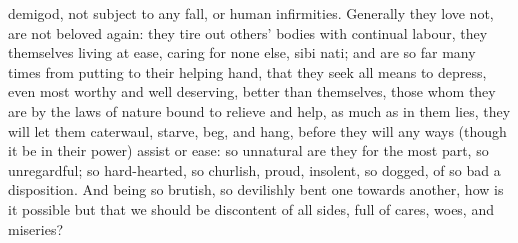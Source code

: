 {{demigod, not subject to any fall, or human infirmities. Generally they
love not, are not beloved again: they tire out others' bodies with
continual labour, they themselves living at ease, caring for none else,
sibi nati; and are so far many times from putting to their helping
hand, that they seek all means to depress, even most worthy and well
deserving, better than themselves, those whom they are by the laws of
nature bound to relieve and help, as much as in them lies, they will
let them caterwaul, starve, beg, and hang, before they will any ways
(though it be in their power) assist or ease: so unnatural are
they for the most part, so unregardful; so hard-hearted, so churlish,
proud, insolent, so dogged, of so bad a disposition. And being so
brutish, so devilishly bent one towards another, how is it possible but
that we should be discontent of all sides, full of cares, woes, and
miseries?

}}
